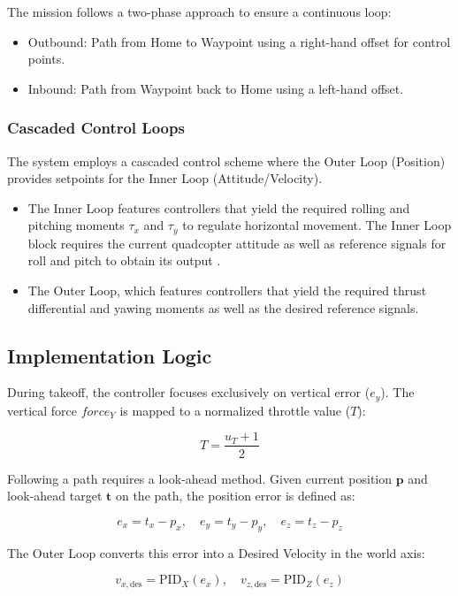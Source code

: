 The mission follows a two-phase approach to ensure a continuous loop:

\begin{itemize}
    \item Outbound: Path from Home to Waypoint using a right-hand offset for control points.
    \item Inbound: Path from Waypoint back to Home using a left-hand offset.
\end{itemize}

\subsubsection{ Cascaded Control Loops}

The system employs a cascaded control scheme where the Outer Loop (Position) provides setpoints for the Inner Loop (Attitude/Velocity).

\begin{itemize}
    \item The Inner Loop features controllers that yield the required rolling and pitching moments $\tau_x$ and $\tau_y$ to regulate horizontal movement. The Inner Loop block requires the current quadcopter attitude as well as reference signals for roll and pitch to obtain its output \parencite{paredes2021quadcopter}.
    \item The Outer Loop, which features controllers that yield the required thrust differential and yawing moments as well as the desired reference signals.
\end{itemize}

\subsection{Implementation Logic}

During takeoff, the controller focuses exclusively on vertical error ($e_y$). The vertical force $force_Y$ is mapped to a normalized throttle value ($T$):

$$T = \frac{u_T + 1}{2}$$

Following a path requires a look-ahead method. Given current position $\mathbf{p}$ and look-ahead target $\mathbf{t}$ on the path, the position error is defined as:

$$
e_x = t_x - p_x,\quad e_y = t_y - p_y,\quad e_z = t_z - p_z
$$

The Outer Loop converts this error into a Desired Velocity in the world axis:

$$v_{x,\text{des}} = \text{PID}_X(e_x),\quad v_{z,\text{des}} = \text{PID}_Z(e_z)$$

